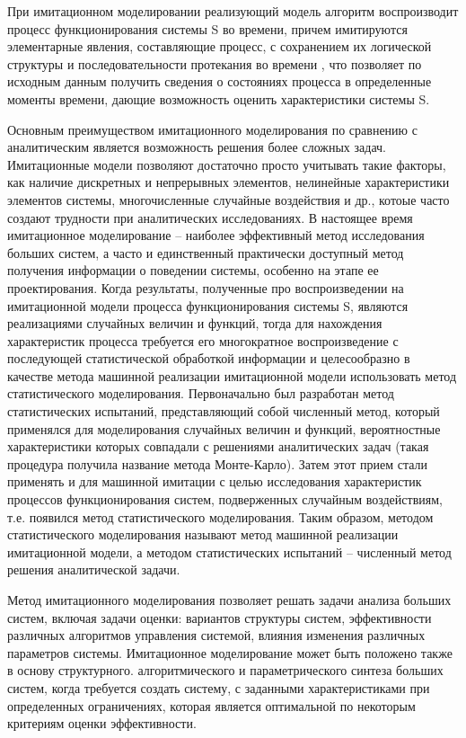    При имитационном моделировании реализующий модель алгоритм воспроизводит процесс функционирования системы S во времени, причем имитируются элементарные явления, составляющие процесс, с сохранением их логической структуры и последовательности протекания во времени , что позволяет по исходным данным получить сведения о состояниях процесса в определенные моменты времени, дающие возможность оценить характеристики системы S.

    Основным преимуществом имитационного моделирования по сравнению с аналитическим является возможность решения более сложных задач. Имитационные модели позволяют достаточно просто учитывать такие факторы, как наличие дискретных и непрерывных элементов, нелинейные характеристики элементов системы, многочисленные случайные воздействия и др., котоые часто создают трудности при аналитических исследованиях. В настоящее время имитационное моделирование -- наиболее эффективный метод исследования больших систем, а часто и единственный практически доступный метод получения информации о поведении системы, особенно на этапе ее проектирования.
    Когда результаты, полученные про воспроизведении на имитационной модели процесса функционирования системы S, являются реализациями случайных величин и функций, тогда для нахождения характеристик процесса требуется его многократное воспроизведение с последующей статистической обработкой информации и целесообразно в качестве метода машинной реализации имитационной модели использовать метод статистического моделирования. Первоначально был разработан метод статистических испытаний, представляющий собой численный метод, который применялся для моделирования случайных величин и функций, вероятностные характеристики которых совпадали с решениями аналитических задач (такая процедура получила название метода Монте-Карло). Затем этот прием стали применять и для машинной имитации с целью исследования характеристик процессов функционирования систем, подверженных случайным воздействиям, т.е. появился метод статистического моделирования. Таким образом, методом статистического моделирования называют метод машинной реализации имитационной модели, а методом статистических испытаний -- численный метод решения аналитической задачи.

    Метод имитационного моделирования позволяет решать задачи анализа больших систем, включая задачи оценки: вариантов структуры систем, эффективности различных алгоритмов управления системой, влияния изменения различных параметров системы. Имитационное моделирование может быть положено также в основу структурного. алгоритмического и параметрического синтеза больших систем, когда требуется создать систему, с заданными характеристиками при определенных ограничениях, которая является оптимальной по некоторым критериям оценки эффективности.

